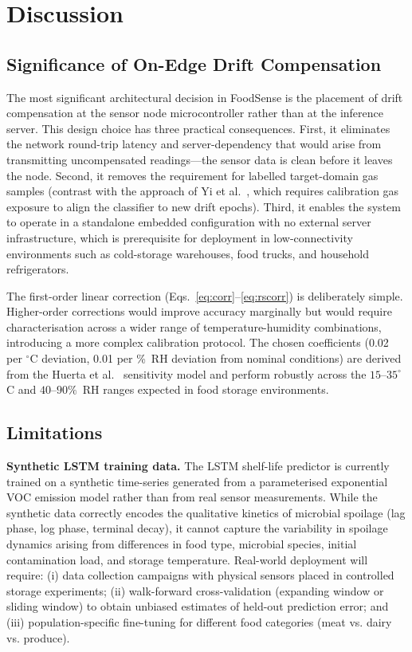 \documentclass{ieeeaccess}
\begin{document}
\section{Discussion}
\label{sec:discussion}

\subsection{Significance of On-Edge Drift Compensation}

The most significant architectural decision in FoodSense is the placement of drift compensation at the sensor node microcontroller rather than at the inference server. This design choice has three practical consequences. First, it eliminates the network round-trip latency and server-dependency that would arise from transmitting uncompensated readings---the sensor data is clean before it leaves the node. Second, it removes the requirement for labelled target-domain gas samples (contrast with the approach of Yi et al.~\cite{Yi2022}, which requires calibration gas exposure to align the classifier to new drift epochs). Third, it enables the system to operate in a standalone embedded configuration with no external server infrastructure, which is prerequisite for deployment in low-connectivity environments such as cold-storage warehouses, food trucks, and household refrigerators.

The first-order linear correction (Eqs.~\ref{eq:corr}--\ref{eq:rscorr}) is deliberately simple. Higher-order corrections would improve accuracy marginally but would require characterisation across a wider range of temperature-humidity combinations, introducing a more complex calibration protocol. The chosen coefficients (0.02 per $^{\circ}$C deviation, 0.01 per \%~RH deviation from nominal conditions) are derived from the Huerta et al.~\cite{Huerta2016} sensitivity model and perform robustly across the $15$--$35^{\circ}$C and $40$--$90\%$~RH ranges expected in food storage environments.

\subsection{Limitations}

\textbf{Synthetic LSTM training data.} The LSTM shelf-life predictor is currently trained on a synthetic time-series generated from a parameterised exponential VOC emission model rather than from real sensor measurements. While the synthetic data correctly encodes the qualitative kinetics of microbial spoilage (lag phase, log phase, terminal decay), it cannot capture the variability in spoilage dynamics arising from differences in food type, microbial species, initial contamination load, and storage temperature. Real-world deployment will require: (i) data collection campaigns with physical sensors placed in controlled storage experiments; (ii) walk-forward cross-validation (expanding window or sliding window) to obtain unbiased estimates of held-out prediction error; and (iii) population-specific fine-tuning for different food categories (meat vs. dairy vs. produce).
\end{document}

